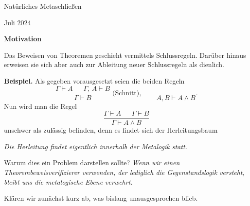 \documentclass[9pt,fleqn,aspectratio=169]{beamer}
\newcommand{\strong}[1]{\textbf{#1}}
\newcommand{\parspace}{\vspace{0.8em}}
\newcommand{\headline}[1]{\begin{center}\strong{#1}\end{center}}
\begin{document}
\begin{frame}
\begin{center}
{\LARGE Natürliches Metaschließen}

\vspace{1em}
{\large Juli 2024}
\end{center}
\end{frame}

\begin{frame}
\headline{Motivation}
\end{frame}

\begin{frame}[t]
\vspace{0.5em}
Das Beweisen von Theoremen geschieht vermittels Schlussregeln. Darüber
hinaus erweisen sie sich aber auch zur Ableitung neuer Schlussregeln
als dienlich.\pause

\parspace
\strong{Beispiel.} Als gegeben vorausgesetzt seien die beiden Regeln
\[\dfrac{\Gamma\vdash A\quad\;\;\Gamma\!,\,A\vdash B}{\Gamma\vdash B}
\;\text{(Schnitt)},\qquad
\dfrac{}{A,B\vdash A\land B}.
\]\pause
Nun wird man die Regel
\[\dfrac{\Gamma\vdash A\quad\;\;\Gamma\vdash B}{\Gamma\vdash A\land B}\]
unschwer als zulässig befinden, denn\pause{} es findet sich der Herleitungsbaum
%
%
\end{frame}

\begin{frame}
\emph{Die Herleitung findet eigentlich innerhalb der Metalogik statt.}\pause

\parspace
Warum dies ein Problem darstellen sollte?\pause{}
\emph{Wenn wir einen Theorembeweisverifizierer verwenden, der lediglich die Gegenstandslogik
versteht, bleibt uns die metalogische Ebene verwehrt.}\pause

\parspace
Klären wir zunächst kurz ab, was bislang unausgesprochen blieb.
\end{frame}
\end{document}

